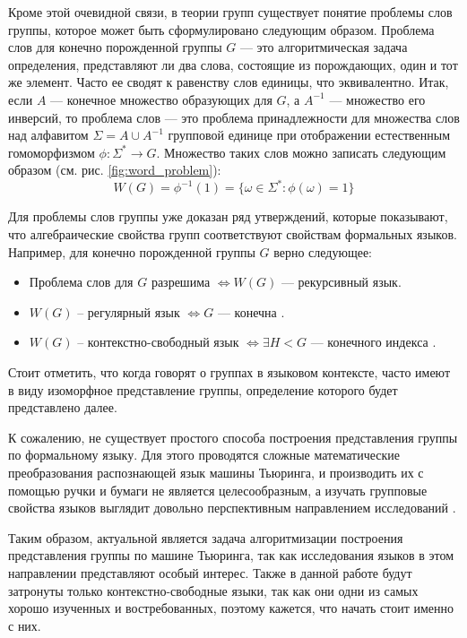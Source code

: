 \documentclass[14pt]{matmex-diploma-custom}
\begin{document}
Кроме этой очевидной связи, в теории групп существует понятие проблемы слов группы,
которое может быть сформулировано следующим образом. 
Проблема слов для конечно порожденной группы $G$ --- это алгоритмическая задача определения, 
представляют ли два слова, состоящие из порождающих, один и тот же элемент. Часто ее сводят к равенству слов единицы, что эквивалентно.
Итак, если $A$ --- конечное множество образующих для $G$, а $A^{-1}$ --- множество его инверсий, 
то проблема слов --- это проблема принадлежности для множества слов над алфавитом 
$\Sigma=A \cup A^{-1}$ групповой единице при отображении естественным гомоморфизмом
$\phi : \Sigma^* \to G$. Множество таких слов можно записать следующим образом (см. рис. \ref{fig:word_problem}):
$$W(G) = \phi^{-1}(1) = 
\{ \omega \in \Sigma^* : \phi(\omega) = 1 \}$$

Для проблемы слов группы уже доказан ряд утверждений, которые показывают, что
алгебраические свойства групп соответствуют свойствам формальных языков. 
Например, для конечно порожденной группы $G$ верно следующее:
\begin{itemize}
    \item Проблема слов для $G$ разрешима $\iff W(G)$ --- рекурсивный язык. 
    \item $W(G)$ -- регулярный язык $\iff G$ --- конечна \cite{Anisimov}.
    \item $W(G)$ -- контекстно-свободный язык $\iff \exists H < G$ --- конечного индекса \cite{Muller}.
\end{itemize}

Стоит отметить, что когда говорят о группах в языковом контексте, часто имеют в виду изоморфное представление группы, определение которого будет представлено далее.

К сожалению, не существует простого способа построения представления группы по формальному языку.
Для этого проводятся сложные математические преобразования распознающей язык машины Тьюринга, и
производить их с помощью ручки и бумаги не является целесообразным, а изучать
групповые свойства языков выглядит довольно перспективным направлением исследований \cite{Sapir, SpaceFunc}.

Таким образом, актуальной является задача алгоритмизации построения представления группы по машине Тьюринга, так как исследования языков в этом направлении представляют особый интерес. Также в данной работе будут затронуты только контекстно-свободные языки, так как они одни из самых хорошо изученных и востребованных, поэтому кажется, что начать стоит именно с них. 
\end{document}
